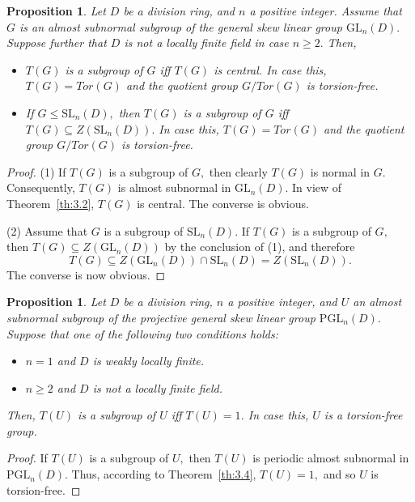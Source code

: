 \documentclass{amsart}
\newtheorem{proposition}[theorem]{Proposition}
\theoremstyle{definition}
\begin{document}
\begin{proposition}\label{pro:3.5} Let $D$ be a division ring, and $n$ a positive integer. Assume that $G$ is an almost subnormal subgroup of the general skew linear group $\mathrm{GL}_n(D).$ Suppose further that $D$ is not a locally finite field in case $n\geq 2.$ Then,
	\begin{itemize}
		\item [(1)] $T(G)$ is a subgroup of $G$ iff $T(G)$ is central. In case this, $T(G)=\mathit{Tor}(G)$ and the quotient group $G/\mathit{Tor}(G)$ is torsion-free.
		\item [(2)] If $G\leq \mathrm{SL}_n(D),$ then $T(G)$ is a subgroup of $G$ iff $T(G)\subseteq Z(\mathrm{SL}_n(D)).$ In case this, $T(G)=\mathit{Tor}(G)$ and the quotient group $G/\mathit{Tor}(G)$ is torsion-free.
	\end{itemize}
\end{proposition}
\begin{proof} (1) If $T(G)$ is a subgroup of $G,$ then clearly $T(G)$ is normal in $G.$ Consequently, $T(G)$ is almost subnormal in $\mathrm{GL}_n(D)$. In view of Theorem~\ref{th:3.2}, $T(G)$ is central. The converse is obvious.
	
(2) Assume that $G$ is a subgroup of $\mathrm{SL}_n(D).$ If $T(G)$ is a subgroup of $G,$ then $T(G)\subseteq Z(\mathrm{GL}_n(D))$ by the conclusion of (1), and therefore $$T(G)\subseteq Z(\mathrm{GL}_n(D))\cap \mathrm{SL}_n(D)=Z(\mathrm{SL}_n(D)).$$ The converse is now obvious.
\end{proof}
\begin{proposition}\label{pro:3.6} Let $D$ be a division ring, $n$ a positive integer, and $U$  an almost subnormal subgroup of the projective general skew linear group $\mathrm{PGL}_n(D).$ Suppose that one of the following two conditions holds:
	\begin{itemize}
		\item [(1)] $n=1$ and $D$ is weakly locally finite.
		\item [(2)] $n\geq 2$ and $D$ is not a locally finite field.
	\end{itemize}
	Then, $T(U)$ is a subgroup of $U$ iff $T(U)=1$. In case this, $U$ is a torsion-free group.
\end{proposition}
\begin{proof} If $T(U)$ is a subgroup of $U,$ then $T(U)$ is periodic almost subnormal in $\mathrm{PGL}_n(D).$ Thus, according to Theorem~\ref{th:3.4}, $T(U)=1,$ and so $U$ is torsion-free.
\end{proof} 
\end{document}
